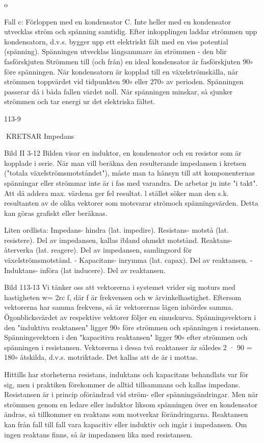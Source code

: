 \documentclass[a4paper,twoside,twocolumn,openright]{book}
\begin{document}
{{{{{o

Fall c: Förloppen med en kondensator C.
Inte heller med en kondensator utvecklas
ström och spänning samtidig. Efter inkopplingen laddar strömmen upp kondensatorn,
d.v.s. bygger upp ett elektriskt fält med en
viss potential (spänning). Spänningen utvecklas långsammare än strömmen - den
blir fasförskjuten
Strömmen till (och från) en ideal kondensator är fasförskjuten 90$\circ$ före spänningen.
När kondensatorn är kopplad till en växelströmskälla, når strömmen toppvärdet vid
tidpunkten 90$\circ$ eller 270$\circ$ av perioden. Spänningen passerar då i båda fallen värdet noll.
När spänningen minskar, så sjunker strömmen och tar energi ur det elektriska fältet.

113-9

KRETSAR
Impedans

Bild II 3-12
Bilden visar en induktor, en kondensator
och en resistor som är kopplade i serie. När
man vill beräkna den resulterande impedansen i kretsen ("totala växelströmsmotståndet"), måste man ta hänsyn till att komponenternas spänningar eller strömmar inte är
i fas med varandra. De arbetar ju inte "i takt".
Att då addera max. värdena ger fel resultat. l stället söker man den s.k. resultanten
av de olika vektorer som motsvarar strömoch spänningsvärden.
Detta kan göras grafiskt eller beräknas.

Liten ordlista:
Impedans- hindra
(lat. impedire).
Resistans- motstå
(lat. resistere).
Del av impedansen,
kallas ibland ohmskt motstånd.
Reaktans- återverka
(lat. reagere).
Del av impedansen,
samlingsord för växelströmsmotstånd.
- Kapacitans- inrymma (lat. capax).
Del av reaktansen.
- Induktans- införa
(lat inducere).
Del av reaktansen.

Bild 113-13
Vi tänker oss att vektorerna i systemet
vrider sig moturs med hastigheten w= 2rc f,
där f är frekvensen och w ärvinkelhastighet.
Eftersom vektorerna har samma frekvens,
så är vektorernas lägen inbördes samma.
Ögonblicksvärdet av respektive vektorer följer en sinuskurva.
Spänningsvektorn i den "induktiva reaktansen" ligger 90$\circ$ före strömmen och spänningen i resistansen. Spänningsvektorn i
den "kapacitiva reaktansen" ligger 90$\circ$ efter
strömmen och spänningen i resistansen.
Vektorerna i dessa två reaktanser är således 2 · 90 = 180$\circ$ åtskilda, d.v.s. motriktade.
Det kallas att de är i mottas.

Hittills har storheterna resistans, induktans
och kapacitans behandlats var för sig, men
i praktiken förekommer de alltid tillsammans
och kallas impedans.
Resistansen är i princip oförändrad vid
ström- eller spänningsändringar. Men när
strömmen genom en ledare eller induktor
liksom spänningen över en kondensator ändras, så tillkommer en reaktans som motverkar förändringarna.
Reaktansen kan från fall till fall vara kapacitiv eller induktiv och ingår i impedansen.
Om ingen reaktans finns, så är impedansen
lika med resistansen.

}}}}}
\end{document}
